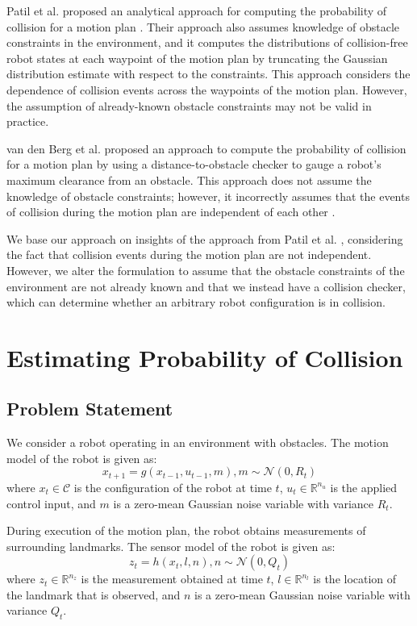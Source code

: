 \documentclass[journal]{IEEEtran}
\begin{document}
Patil et al. proposed an analytical approach for computing the probability of collision for a motion plan \cite{IEEEhowto:patil}. Their approach also assumes knowledge of obstacle constraints in the environment, and it computes the distributions of collision-free robot states at each waypoint of the motion plan by truncating the Gaussian distribution estimate with respect to the constraints. This approach considers the dependence of collision events across the waypoints of the motion plan. However, the assumption of already-known obstacle constraints may not be valid in practice.

van den Berg et al. proposed an approach to compute the probability of collision for a motion plan by using a distance-to-obstacle checker to gauge a robot's maximum clearance from an obstacle. This approach does not assume the knowledge of obstacle constraints; however, it incorrectly assumes that the events of collision during the motion plan are independent of each other \cite{IEEEhowto:van_den_berg}.

We base our approach on insights of the approach from Patil et al. \cite{IEEEhowto:patil}, considering the fact that collision events during the motion plan are not independent. However, we alter the formulation to assume that the obstacle constraints of the environment are not already known and that we instead have a collision checker, which can determine whether an arbitrary robot configuration is in collision.

\section{Estimating Probability of Collision}
\subsection{Problem Statement}
We consider a robot operating in an environment with obstacles.%
The motion model of the robot is given as:
$$x_{t+1} = g(x_{t-1}, u_{t-1}, m), m \sim \mathcal{N}(0,R_t)$$
where $x_t \in \mathcal{C}$ is the configuration of the robot at time $t$, $u_t \in\mathbb{R}^{n_u}$ is the applied control input, and $m$ is a zero-mean Gaussian noise variable with variance $R_t$.

During execution of the motion plan, the robot obtains measurements of surrounding landmarks. The sensor model of the robot is given as:
$$z_t = h(x_t,l,n), n \sim \mathcal{N}(0,Q_t)$$
where $z_t \in \mathbb{R}^{n_z}$ is the measurement obtained at time $t$, $l \in \mathbb{R}^{n_l}$ is the location of the landmark that is observed, and $n$ is a zero-mean Gaussian noise variable with variance $Q_t$.
\end{document}
